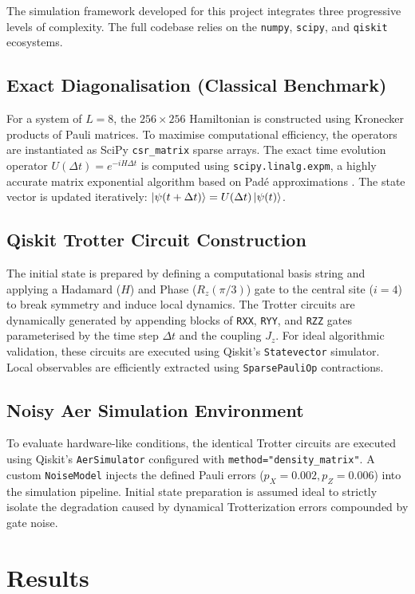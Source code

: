 \documentclass[11pt,a4paper]{article}
\begin{document}
The simulation framework developed for this project integrates three progressive levels of complexity. The full codebase relies on the \texttt{numpy}, \texttt{scipy}, and \texttt{qiskit} ecosystems.

\subsection{Exact Diagonalisation (Classical Benchmark)}
For a system of $L=8$, the $256 \times 256$ Hamiltonian is constructed using Kronecker products of Pauli matrices. To maximise computational efficiency, the operators are instantiated as SciPy \texttt{csr\_matrix} sparse arrays. The exact time evolution operator $U(\Delta t) = e^{-iH\Delta t}$ is computed using \texttt{scipy.linalg.expm}, a highly accurate matrix exponential algorithm based on Pad\'e approximations \cite{AlMohy2011}. The state vector is updated iteratively: $\ket{\psi(t+\Delta t)} = U(\Delta t)\ket{\psi(t)}$.

\subsection{Qiskit Trotter Circuit Construction}
The initial state is prepared by defining a computational basis string and applying a Hadamard ($H$) and Phase ($R_z(\pi/3)$) gate to the central site ($i=4$) to break symmetry and induce local dynamics. The Trotter circuits are dynamically generated by appending blocks of \texttt{RXX}, \texttt{RYY}, and \texttt{RZZ} gates parameterised by the time step $\Delta t$ and the coupling $J_z$. For ideal algorithmic validation, these circuits are executed using Qiskit's \texttt{Statevector} simulator. Local observables are efficiently extracted using \texttt{SparsePauliOp} contractions.

\subsection{Noisy Aer Simulation Environment}
To evaluate hardware-like conditions, the identical Trotter circuits are executed using Qiskit's \texttt{AerSimulator} configured with \texttt{method="density\_matrix"}. A custom \texttt{NoiseModel} injects the defined Pauli errors ($p_X = 0.002, p_Z = 0.006$) into the simulation pipeline. Initial state preparation is assumed ideal to strictly isolate the degradation caused by dynamical Trotterization errors compounded by gate noise.

\section{Results} \label{sec:results}
\end{document}
